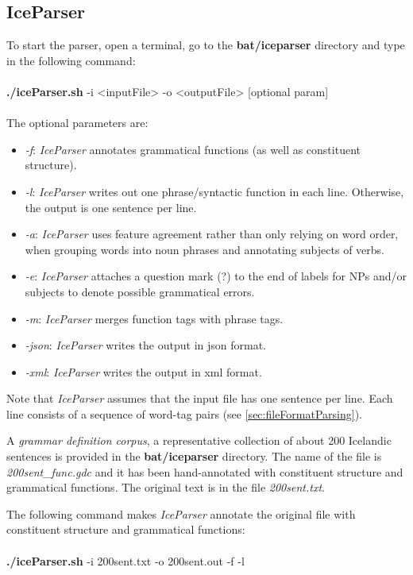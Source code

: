 \documentclass[11pt]{article}
\begin{document}
\subsection{IceParser}
To start the parser, open a terminal, go to the \textbf{bat/iceparser} directory and type in the following command:\\ \\
{\bf ./iceParser.sh} -i <inputFile> -o <outputFile> [optional param] \\ \\
The optional parameters are:
\begin{itemize}
\item \emph{-f}: \emph{IceParser} annotates grammatical functions (as well as constituent structure).
\item \emph{-l}: \emph{IceParser} writes out one phrase/syntactic function in each line. Otherwise, the output is one sentence per line.
\item \emph{-a}: \emph{IceParser} uses feature agreement rather than only relying on word order, when grouping words into noun phrases and annotating subjects of verbs.
\item \emph{-e}: \emph{IceParser} attaches a question mark (?) to the end of labels for NPs and/or subjects to denote possible grammatical errors.
\item \emph{-m}: \emph{IceParser} merges function tags with phrase tags.
\item \emph{-json}: \emph{IceParser} writes the output in json format.
\item \emph{-xml}: \emph{IceParser} writes the output in xml format.
\end{itemize}

Note that \emph{IceParser} assumes that the input file has one sentence per line.
Each line consists of a sequence of word-tag pairs (see \ref{sec:fileFormatParsing}).

A \emph{grammar definition corpus}, a representative collection of about 200 Icelandic sentences \citep{lof06c} is provided in the \textbf{bat/iceparser} directory.
The name of the file is \emph{200sent\_func.gdc} and it has been hand-annotated with constituent structure and grammatical functions.
The original text is in the file \emph{200sent.txt}.

The following command makes \emph{IceParser} annotate the original file with constituent structure and grammatical functions: \\ \\
{\bf ./iceParser.sh} -i 200sent.txt -o 200sent.out -f -l \\
\end{document}
